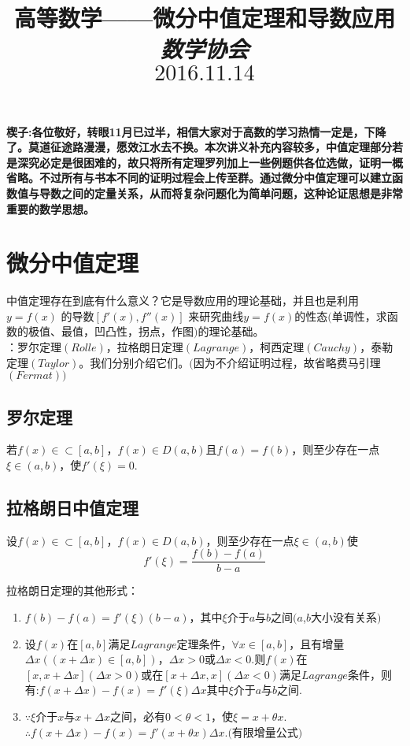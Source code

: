 \documentclass[UTF8]{ctexart}
\date{}
\title{\textbf{\small 高等数学——微分中值定理和导数应用 \\  \emph{数学协会}\\$2016.11.14$}}
\begin{document}
\maketitle
\thispagestyle{fancy}
\vspace{-20mm} \textbf{\small 楔子:各位敬好，转眼11月已过半，相信大家对于高数的学习热情一定是，下降了。莫道征途路漫漫，愿效江水去不换。本次讲义补充内容较多，中值定理部分若是深究必定是很困难的，故只将所有定理罗列加上一些例题供各位选做，证明一概省略。不过所有与书本不同的证明过程会上传至群。通过微分中值定理可以建立函数值与导数之间的定量关系，从而将复杂问题化为简单问题，这种论证思想是非常重要的数学思想。}
\vspace{-8mm} \section{微分中值定理} \vspace{-2mm} \small 中值定理存在到底有什么意义？它是导数应用的理论基础，并且也是利用$y=f(x)$ 的导数$[f'(x),f''(x)]$ 来研究曲线$y=f(x)$的性态$($单调性，求函数的极值、最值，凹凸性，拐点，作图$)$的理论基础。
\\：罗尔定理$(Rolle)$，拉格朗日定理$(Lagrange)$，柯西定理$(Cauchy)$，泰勒定理$(Taylor)$。我们分别介绍它们。$($因为不介绍证明过程，故省略费马引理$(Fermat))$
\vspace{-4mm} \subsection{罗尔定理}  \vspace{-2mm} \small 若$f(x)\in\subset[a,b]$，$f(x)\in D(a,b)$且$f(a)=f(b)$，则至少存在一点$\xi\in(a,b)$，使$f'(\xi)=0$.
\vspace{-4mm} \subsection{拉格朗日中值定理} \vspace{-2mm}\small 设$f(x)\in\subset[a,b]$，$f(x)\in D(a,b)$，则至少存在一点$\xi\in(a,b)$使
$$f'(\xi)=\frac{f(b)-f(a)}{b-a}$$
\begin{CJK}{UTF8}{fs}
拉格朗日定理的其他形式：
\begin{enumerate}[(1)]
\item $f(b)-f(a)=f'(\xi)(b-a)$，其中$\xi$介于$a$与$b$之间$(a$,$b$大小没有关系$)$
\item 设$f(x)$在$[a,b]$满足$Lagrange$定理条件，$\forall x\in [a,b]$，且有增量$\Delta x((x+\Delta x)\in [a,b])$，$\Delta x>0$或$\Delta x<0$.则$f(x)$在$[x,x+\Delta x](\Delta x>0)$或在$[x+\Delta x,x](\Delta x<0)$满足$Lagrange$条件，则有:$f(x+\Delta x)-f(x)=f'(\xi)\Delta x$其中$\xi$介于$a$与$b$之间.
\item $\because \xi$介于$x$与$x+\Delta x$之间，必有$0<\theta<1$，使$\xi=x+\theta x$.\quad$\therefore f(x+\Delta x)-f(x)=f'(x+\theta x)\Delta x$.$($有限增量公式$)$
\end{enumerate}
\end{CJK}
\end{document}
